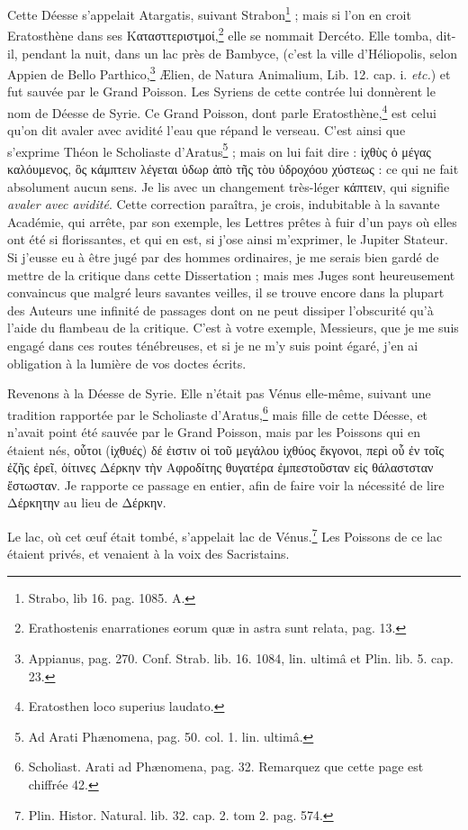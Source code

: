 \documentclass[a4paper, 18pt, oneside]{article}
\begin{document}
Cette Déesse s'appelait Atargatis, suivant Strabon\footnote{Strabo, lib 16. pag. 1085. A.} ; mais si l'on en croit Eratosthène dans ses Κατασττεριστμοί,\footnote{Erathostenis enarrationes eorum quæ in astra sunt relata, pag. 13.} elle se nommait Dercéto. Elle tomba, dit-il, pendant la nuit, dans un lac près de Bambyce, (c'est la ville d'Héliopolis, selon Appien de Bello Parthico,\footnote{Appianus, pag. 270. Conf. Strab. lib. 16. 1084, lin. ultimâ et Plin. lib. 5. cap. 23.} Ælien, de Natura Animalium, Lib. 12. cap. i. \emph{etc.}) et fut sauvée par le Grand Poisson. Les Syriens de cette contrée lui donnèrent le nom de Déesse de Syrie. Ce Grand Poisson, dont parle Eratosthène,\footnote{Eratosthen loco superius laudato.} est celui qu'on dit avaler avec avidité l'eau que répand le verseau. C'est ainsi que s'exprime Théon le Scholiaste d'Aratus\footnote{Ad Arati Phænomena, pag. 50. col. 1. lin. ultimâ.} ; mais on lui fait dire : ἰχθὺς ὁ μέγας καλόυμενος, ὃς κάμπτειν λέγεται ὑδωρ ἀπὸ τῆς τὸυ ὑδροχόου χύστεως : ce qui ne fait absolument aucun sens. Je lis avec un changement très-léger κάπτειν, qui signifie \emph{avaler avec avidité}. Cette correction paraîtra, je crois, indubitable à la savante Académie, qui arrête, par son exemple, les Lettres prêtes à fuir d'un pays où elles ont été si florissantes, et qui en est, si j'ose ainsi m'exprimer, le Jupiter Stateur. Si j'eusse eu à être jugé par des hommes ordinaires, je me serais bien gardé de mettre de la critique dans cette Dissertation ; mais mes Juges sont heureusement convaincus que malgré leurs savantes veilles, il se trouve encore dans la plupart des Auteurs une infinité de passages dont on ne peut dissiper l'obscurité qu'à l'aide du flambeau de la critique. C'est à votre exemple, Messieurs, que je me suis engagé dans ces routes ténébreuses, et si je ne m'y suis point égaré, j'en ai obligation à la lumière de vos doctes écrits.

Revenons à la Déesse de Syrie. Elle n'était pas Vénus elle-même, suivant une tradition rapportée par le Scholiaste d'Aratus,\footnote{Scholiast. Arati ad Phænomena, pag. 32. Remarquez que cette page est chiffrée 42.} mais fille de cette Déesse, et n'avait point été sauvée par le Grand Poisson, mais par les Poissons qui en étaient nés, οὗτοι (ἰχθυές) δέ ἐιστιν οἱ τοῦ μεγάλου ἰχθύος ἔκγονοι, περὶ οὗ ἐν τοῖς ἐζῆς ἐρεῖ, ὁίτινες Δέρκην τὴν Αφροδίτης θυγατέρα ἐμπεστοῦσταν εἰς θάλαστσταν ἔστωσταν. Je rapporte ce passage en entier, afin de faire voir la nécessité de lire Δέρκητην au lieu de Δέρκην.

Le lac, où cet œuf était tombé, s'appelait lac de Vénus.\footnote{Plin. Histor. Natural. lib. 32. cap. 2. tom 2. pag. 574.} Les Poissons de ce lac étaient privés, et venaient à la voix des Sacristains.
\end{document}
